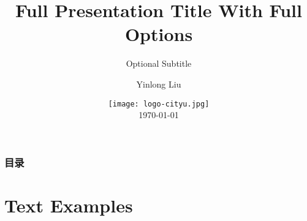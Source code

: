 \documentclass[
	9pt, %
	fontset=none,
]{beamer}
\title[Short Title]{Full Presentation Title With Full Options} %
\subtitle{Optional Subtitle} %
\author[Liu]{Yinlong Liu} %
\institute[CityU 澳门城市大学]{City University of Macao} %
\date[\today]{\texttt{[image: logo-cityu.jpg]} \\ \today} %
\begin{document}

\begin{frame}
	\titlepage %
\end{frame}



\begin{frame}
	\frametitle{目录} %
	
	\tableofcontents%
\end{frame}


\section{Text Examples} %
\end{document}
